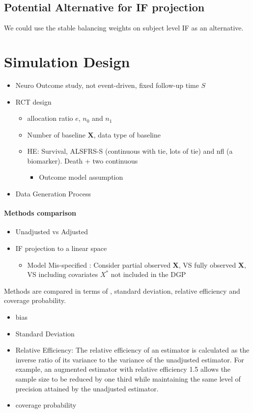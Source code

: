\documentclass[11pt,a4paper]{article}
\begin{document}
\subsection{Potential Alternative for IF projection}
We could use the stable balancing weights on subject level IF as an alternative. 


\section{Simulation Design}
\begin{itemize}
    \item Neuro Outcome study, not event-driven, fixed follow-up time $S$
    \item RCT design
    \begin{itemize}
        \item allocation ratio $e$, $n_0$ and $n_1$
        \item Number of baseline $\mathbf{X}$, data type of baseline
        \item  HE: Survival, ALSFRS-S (continuous with tie, lots of tie) and nfl (a biomarker). Death + two continuous
        \begin{itemize}
            \item Outcome model assumption
        \end{itemize}
    \end{itemize}
    \item Data Generation Process
\end{itemize}

\paragraph{Methods comparison}
\begin{itemize}
    \item Unadjusted vs Adjusted
    \item IF projection to a linear space
    \begin{itemize}
        \item Model Mis-specified : Consider partial observed $\mathbf{X}$, VS fully observed $\mathbf{X}$, VS including covariates $X^*$ not included in the DGP
    \end{itemize}
\end{itemize}
Methods are compared in terms of , standard deviation, relative efficiency and coverage probability. 
\begin{itemize}
    \item bias
    \item Standard Deviation
    \item Relative Efficiency: The relative efficiency of an estimator is calculated as the inverse ratio of its variance to the variance of the unadjusted estimator. For example, an augmented estimator with relative efficiency 1.5 allows the sample size to be reduced by one third while maintaining the same level of precision attained by the unadjusted estimator.
    \item coverage probability
\end{itemize}
\end{document}
